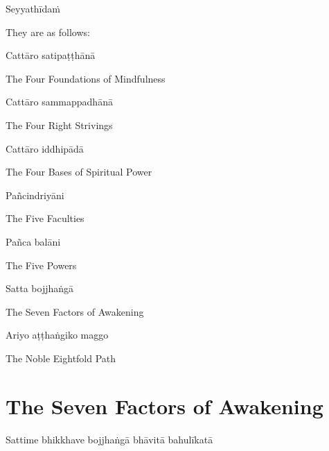 Seyyathīdaṁ

\begin{cprenglish}
They are as follows:
\end{cprenglish}

Cattāro satipaṭṭhānā

\begin{cprenglish}
The Four Foundations of Mindfulness
\end{cprenglish}

Cattāro sammappadhānā

\begin{cprenglish}
The Four Right Strivings
\end{cprenglish}

Cattāro iddhipādā

\begin{cprenglish}
The Four Bases of Spiritual Power
\end{cprenglish}

Pañcindriyāni

\begin{cprenglish}
The Five Faculties
\end{cprenglish}

Pañca balāni

\begin{cprenglish}
The Five Powers
\end{cprenglish}

Satta bojjhaṅgā

\begin{cprenglish}
The Seven Factors of Awakening
\end{cprenglish}

Ariyo aṭṭhaṅgiko maggo

\begin{cprenglish}
The Noble Eightfold Path
\end{cprenglish}


\clearpage

\section*{The Seven Factors of Awakening}

\begin{leader}
\end{leader}

Sattime bhikkhave bojjhaṅgā bhāvitā bahulīkatā

